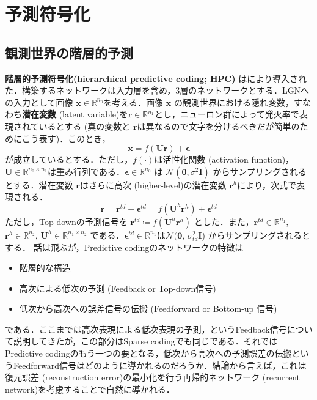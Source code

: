 \section{予測符号化}
\subsection{観測世界の階層的予測}
\textbf{階層的予測符号化(hierarchical predictive coding; HPC)} は\citep{Rao1999-zv}により導入された．構築するネットワークは入力層を含め，3層のネットワークとする．LGNへの入力として画像 $\mathbf{x} \in \mathbb{R}^{n_0}$を考える．画像 $\mathbf{x}$ の観測世界における隠れ変数，すなわち\textbf{潜在変数} (latent variable)を$\mathbf{r} \in \mathbb{R}^{n_1}$とし，ニューロン群によって発火率で表現されているとする (真の変数と $\mathbf{r}$は異なるので文字を分けるべきだが簡単のためにこう表す)．このとき，
\begin{equation}
\mathbf{x} = f(\mathbf{U}\mathbf{r}) + \boldsymbol{\epsilon}
\end{equation}
が成立しているとする．ただし，$f(\cdot)$は活性化関数 (activation function)，$\mathbf{U} \in \mathbb{R}^{n_0 \times n_1}$は重み行列である．$\boldsymbol{\epsilon} \in \mathbb{R}^{n_0}$ は $\mathcal{N}(\mathbf{0}, \sigma^2 \mathbf{I})$ からサンプリングされるとする．潜在変数 $\mathbf{r}$はさらに高次 (higher-level)の潜在変数 $\mathbf{r}^h$により，次式で表現される．
\begin{equation}
\mathbf{r} = \mathbf{r}^{td}+\boldsymbol{\epsilon}^{td}=f(\mathbf{U}^h \mathbf{r}^h)+\boldsymbol{\epsilon}^{td}
\end{equation}
ただし，Top-downの予測信号を $\mathbf{r}^{td}\coloneqq f(\mathbf{U}^h \mathbf{r}^h)$ とした．また，$\mathbf{r}^{td} \in \mathbb{R}^{n_1}$, $\mathbf{r}^{h} \in \mathbb{R}^{n_2}$, $\mathbf{U}^h \in \mathbb{R}^{n_1 \times n_2}$ である．$\boldsymbol{\epsilon}^{td} \in \mathbb{R}^{n_1}$は$\mathcal{N}(\mathbf{0}$, $\sigma_{td}^2 \mathbf{I}$) からサンプリングされるとする．
話は飛ぶが，Predictive codingのネットワークの特徴は
\begin{itemize}
\item 階層的な構造
\item 高次による低次の予測 (Feedback or Top-down信号)
\item 低次から高次への誤差信号の伝搬 (Feedforward or Bottom-up 信号)
\end{itemize}
である．ここまでは高次表現による低次表現の予測，というFeedback信号について説明してきたが，この部分はSparse codingでも同じである．それではPredictive codingのもう一つの要となる，低次から高次への予測誤差の伝搬というFeedforward信号はどのように導かれるのだろうか．結論から言えば，これは復元誤差 (reconstruction error)の最小化を行う再帰的ネットワーク (recurrent network)を考慮することで自然に導かれる．
